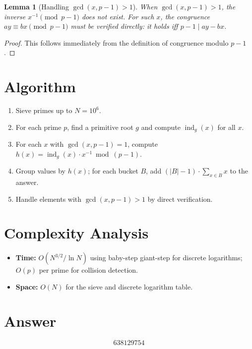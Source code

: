 \documentclass[11pt]{article}
\newtheorem{lemma}[theorem]{Lemma}
\begin{document}
\begin{lemma}[Handling $\gcd(x, p-1) > 1$]
When $\gcd(x, p-1) > 1$, the inverse $x^{-1} \pmod{p-1}$ does not exist. For such $x$, the congruence $ay \equiv bx \pmod{p-1}$ must be verified directly: it holds iff $p - 1 \mid ay - bx$.
\end{lemma}

\begin{proof}
This follows immediately from the definition of congruence modulo $p-1$.
\end{proof}

\section{Algorithm}

\begin{enumerate}
    \item Sieve primes up to $N = 10^6$.
    \item For each prime $p$, find a primitive root $g$ and compute $\operatorname{ind}_g(x)$ for all $x$.
    \item For each $x$ with $\gcd(x, p-1) = 1$, compute $h(x) = \operatorname{ind}_g(x) \cdot x^{-1} \bmod (p-1)$.
    \item Group values by $h(x)$; for each bucket $B$, add $(|B|-1) \cdot \sum_{x \in B} x$ to the answer.
    \item Handle elements with $\gcd(x, p-1) > 1$ by direct verification.
\end{enumerate}

\section{Complexity Analysis}

\begin{itemize}
    \item \textbf{Time:} $O(N^{3/2}/\ln N)$ using baby-step giant-step for discrete logarithms; $O(p)$ per prime for collision detection.
    \item \textbf{Space:} $O(N)$ for the sieve and discrete logarithm table.
\end{itemize}

\section{Answer}

\[
\boxed{638129754}
\]
\end{document}

